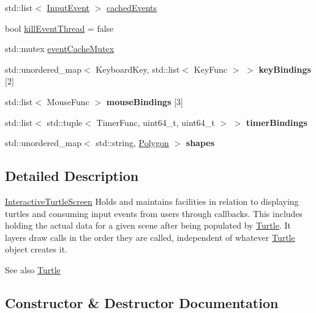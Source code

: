 \begin{DoxyCompactItemize}
\item 
std\+::list$<$ \hyperlink{structcturtle_1_1InputEvent}{Input\+Event} $>$ \hyperlink{classcturtle_1_1InteractiveTurtleScreen_a1573f71b0a5125a4cdfd5cbf8096f271}{cached\+Events}
\item 
bool \hyperlink{classcturtle_1_1InteractiveTurtleScreen_a800665243e7f329177b4bfa12213a063}{kill\+Event\+Thread} = false
\item 
std\+::mutex \hyperlink{classcturtle_1_1InteractiveTurtleScreen_ab31b4060c56cf038540277f041a4bf4a}{event\+Cache\+Mutex}
\item 
std\+::unordered\+\_\+map$<$ Keyboard\+Key, std\+::list$<$ Key\+Func $>$ $>$ {\bfseries key\+Bindings} \mbox{[}2\mbox{]}
\item 
std\+::list$<$ Mouse\+Func $>$ {\bfseries mouse\+Bindings} \mbox{[}3\mbox{]}
\item 
\mbox{\label{classcturtle_1_1InteractiveTurtleScreen_a4df96b64c8abe7fa20aba4b376744136}} 
std\+::list$<$ std\+::tuple$<$ Timer\+Func, uint64\+\_\+t, uint64\+\_\+t $>$ $>$ {\bfseries timer\+Bindings}
\item 
std\+::unordered\+\_\+map$<$ std\+::string, \hyperlink{classcturtle_1_1Polygon}{Polygon} $>$ {\bfseries shapes}
\end{DoxyCompactItemize}


\subsection{Detailed Description}
\hyperlink{classcturtle_1_1InteractiveTurtleScreen}{Interactive\+Turtle\+Screen} Holds and maintains facilities in relation to displaying turtles and consuming input events from users through callbacks. This includes holding the actual data for a given scene after being populated by \hyperlink{classcturtle_1_1Turtle}{Turtle}. It layers draw calls in the order they are called, independent of whatever \hyperlink{classcturtle_1_1Turtle}{Turtle} object creates it.

\begin{DoxySeeAlso}{See also}
\hyperlink{classcturtle_1_1Turtle}{Turtle} 
\end{DoxySeeAlso}


\subsection{Constructor \& Destructor Documentation}
\mbox{\label{classcturtle_1_1InteractiveTurtleScreen_a3a2fc53b07958002992b8189a5af62f6}} 

